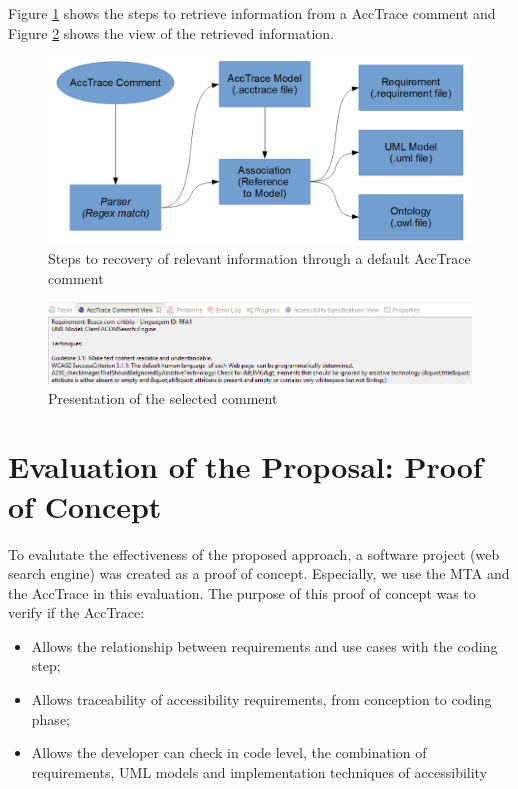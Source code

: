 \documentclass[10pt, conference, compsocconf]{IEEEtran}
\begin{document}
Figure \ref{fig:commentrecovery} shows the steps to retrieve information from a AccTrace comment and Figure \ref{fig:commentview}
shows the view of the retrieved information.


\begin{figure}[h!]
\centering
\includegraphics[scale=0.40]{./img/commentrecovery.png}
\caption{Steps to recovery of relevant information through a
default AccTrace comment}
\label{fig:commentrecovery}
\end{figure} 

\begin{figure}[h!]
\centering
\includegraphics[scale=0.60]{./img/commentview.png}
\caption{Presentation of the selected comment}
\label{fig:commentview}
\end{figure}

\section{Evaluation of the Proposal: Proof of Concept} 

To evalutate the effectiveness of the proposed approach, a software project (web search engine) was created as a proof of concept. Especially, we use the MTA and the AccTrace in this evaluation. The purpose of this proof of concept was to verify if the AccTrace:

\begin{itemize}
  \item Allows the relationship between requirements and use cases with the coding step;
  \item Allows traceability of accessibility requirements, from conception to coding phase;   
  \item Allows the developer can check in code level, the combination of requirements, UML models and implementation techniques of accessibility
\end{itemize}
\end{document}
